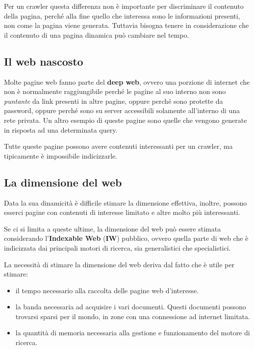 Per un crawler questa differenza non è importante per discriminare il contenuto della pagina, perché alla fine quello che interessa sono le informazioni presenti, non come la pagina viene generata.
Tuttavia bisogna tenere in considerazione che il contenuto di una pagina dinamica può cambiare nel tempo.

\subsection{Il web nascosto}

Molte pagine web fanno parte del \textbf{deep web}, ovvero una porzione di internet che non è normalmente raggiungibile perché le pagine al suo interno non sono \textit{puntante} da link presenti in altre pagine, oppure perché sono protette da password, oppure perché sono su server accessibili solamente all'interno di una rete privata. Un altro esempio di queste pagine sono quelle che vengono generate in risposta ad una determinata query.

Tutte queste pagine possono avere contenuti interessanti per un crawler, ma tipicamente è impossibile indicizzarle.

\subsection{La dimensione del web}

Data la sua dinamicità è difficile stimare la dimensione effettiva, inoltre, possono esserci pagine con contenuti di interesse limitato e altre molto più interessanti.

Se ci si limita a queste ultime, la dimensione del web può essere stimata considerando l'\textbf{Indexable Web} (\textbf{IW}) pubblico, ovvero quella parte di web che è indicizzata dai principali motori di ricerca, sia generalistici che specialistici.

La necessità di stimare la dimensione del web deriva dal fatto che è utile per stimare:

\begin{itemize}
	\item il tempo necessario alla raccolta delle pagine web d'interesse.
	\item la banda necessaria ad acquisire i vari documenti. Questi documenti possono trovarsi sparsi per il mondo, in zone con una connessione ad internet limitata.
	\item la quantità di memoria necessaria alla gestione e funzionamento del motore di ricerca.
\end{itemize}





















